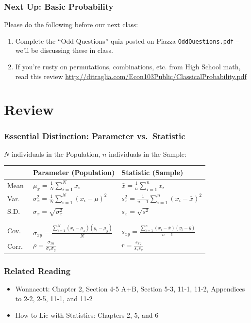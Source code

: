 \documentclass{beamer}
\begin{document}
\begin{frame}
  \frametitle{Next Up: Basic Probability}
  Please do the following before our next class:
      \vspace{1em}
  \begin{enumerate}
    \item Complete the ``Odd Questions'' quiz posted on Piazza \texttt{OddQuestions.pdf} -- we'll be discussing these in class.
      \vspace{1em}
    \item If you're rusty on permutations, combinations, etc. from High School math, read this review \footnotesize \url{http://ditraglia.com/Econ103Public/ClassicalProbability.pdf}
  \end{enumerate}
\end{frame}

\section{Review}
\begin{frame}
\frametitle{Essential Distinction: Parameter vs.\ Statistic}
	$N$ individuals in the Population, $n$ individuals in the Sample:
	\vspace{1em}
	\small
	\begin{tabular}{l|l|l}
		&\textbf{Parameter} (Population)&\textbf{Statistic} (Sample)\\
		\hline
		Mean&$\displaystyle\mu_x = \frac{1}{N} \sum_{i = 1}^N x_i$& $\displaystyle\bar{x} = \frac{1}			{n} \sum_{i = 1}^n x_i$ \\
		Var.\ &$\displaystyle \sigma_x^2 = \frac{1}{N}\sum_{i = 1}^N (x_i - \mu)^2$ &$\displaystyle 			s_x^2 = \frac{1}{n - 1}\sum_{i = 1}^n(x_i - \bar{x})^2$\\
		S.D.\ &$\sigma_x = \sqrt{\sigma_x^2}$ &$s_x = \sqrt{s^2}$ \\
		&&\\
		\hline
		&&\\
		\alert{Cov.\ }&\alert{$\displaystyle \sigma_{xy} = \frac{\sum_{i = 1}^N(x_i - \mu_x)(y_i - 				\mu_y)}{N}$} &\alert{$\displaystyle s_{xy} = \frac{\sum_{i = 1}^n(x_i - \bar{x})(y_i - \bar{y})}			{n - 1}$}\\
		\alert{Corr.\ } & \alert{$\displaystyle \rho = \frac{\sigma_{xy}}{\sigma_x \sigma_y}$}& 					\alert{$\displaystyle r = \frac{s_{xy}}{s_x s_y}$}
	\end{tabular}
\end{frame}

\begin{frame}
\frametitle{Related Reading}
	\begin{itemize}
		\item Wonnacott: Chapter 2, Section 4-5 A+B, Section 5-3, 11-1, 11-2, Appendices to 2-2, 2-5, 11-1, and 11-2
		\item How to Lie with Statistics: Chapters 2, 5, and 6
	\end{itemize}
\end{frame}

\end{document}
